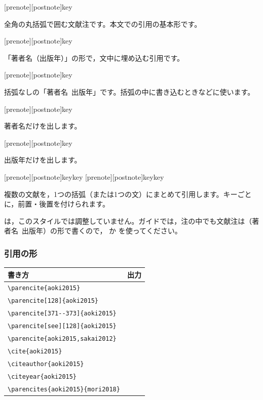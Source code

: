\begin{ltxsyntax}
[prenote][postnote]{key}

全角の丸括弧で囲む文献注です。本文での引用の基本形です。

[prenote][postnote]{key}

「著者名（出版年）」の形で，文中に埋め込む引用です。

[prenote][postnote]{key}

括弧なしの「著者名\ 出版年」です。括弧の中に書き込むときなどに使います。

[prenote][postnote]{key}

著者名だけを出します。

[prenote][postnote]{key}

出版年だけを出します。

[prenote][postnote]{key}{key}
[prenote][postnote]{key}{key}

複数の文献を，1つの括弧（または1つの文）にまとめて引用します。キーごとに，前置・後置を付けられます。
\end{ltxsyntax}

\begin{caution}
 は，このスタイルでは調整していません。ガイドでは，注の中でも文献注は（著者名\ 出版年）の形で書くので， か  を使ってください。
\end{caution}

\subsubsection{引用の形}
\begin{center}\small
\begin{tabular}{@{}L{0.46\textwidth}L{0.42\textwidth}@{}}
\toprule
\textbf{書き方} & \textbf{出力} \\
\midrule
\verb|\parencite{aoki2015}| & \parencite{aoki2015} \\
\verb|\parencite[128]{aoki2015}| & \parencite[128]{aoki2015} \\
\verb|\parencite[371--373]{aoki2015}| & \parencite[371--373]{aoki2015} \\
\verb|\parencite[see][128]{aoki2015}| & \parencite[see][128]{aoki2015} \\
\verb|\parencite{aoki2015,sakai2012}| & \parencite{aoki2015,sakai2012} \\
\verb|\cite{aoki2015}| & \cite{aoki2015} \\
\verb|\citeauthor{aoki2015}| & \citeauthor{aoki2015} \\
\verb|\citeyear{aoki2015}| & \citeyear{aoki2015} \\
\verb|\parencites{aoki2015}{mori2018}| & \parencites{aoki2015}{mori2018} \\
\bottomrule
\end{tabular}
\end{center}

